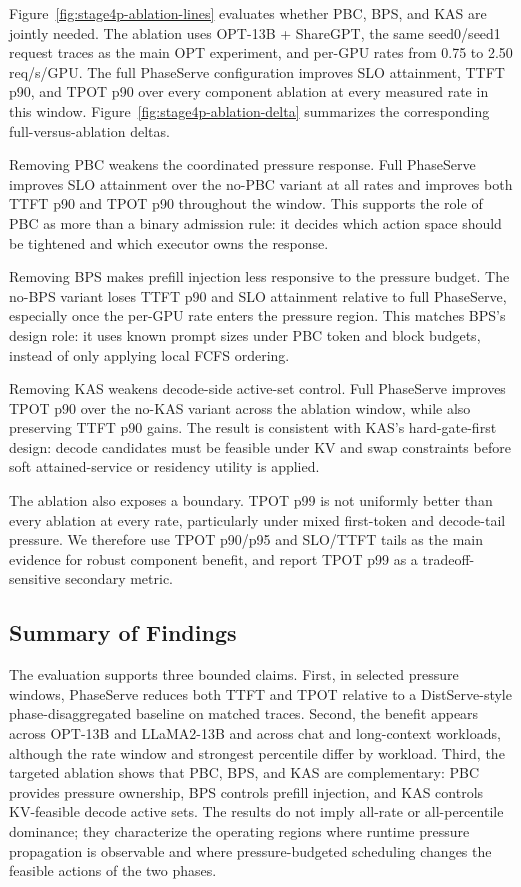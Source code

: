 \documentclass[lettersize,journal]{IEEEtran}
\begin{document}
Figure~\ref{fig:stage4p-ablation-lines} evaluates whether PBC, BPS, and KAS are jointly needed. The ablation uses OPT-13B + ShareGPT, the same seed0/seed1 request traces as the main OPT experiment, and per-GPU rates from 0.75 to 2.50 req/s/GPU. The full PhaseServe configuration improves SLO attainment, TTFT p90, and TPOT p90 over every component ablation at every measured rate in this window. Figure~\ref{fig:stage4p-ablation-delta} summarizes the corresponding full-versus-ablation deltas.

Removing PBC weakens the coordinated pressure response. Full PhaseServe improves SLO attainment over the no-PBC variant at all rates and improves both TTFT p90 and TPOT p90 throughout the window. This supports the role of PBC as more than a binary admission rule: it decides which action space should be tightened and which executor owns the response.

Removing BPS makes prefill injection less responsive to the pressure budget. The no-BPS variant loses TTFT p90 and SLO attainment relative to full PhaseServe, especially once the per-GPU rate enters the pressure region. This matches BPS's design role: it uses known prompt sizes under PBC token and block budgets, instead of only applying local FCFS ordering.

Removing KAS weakens decode-side active-set control. Full PhaseServe improves TPOT p90 over the no-KAS variant across the ablation window, while also preserving TTFT p90 gains. The result is consistent with KAS's hard-gate-first design: decode candidates must be feasible under KV and swap constraints before soft attained-service or residency utility is applied.

The ablation also exposes a boundary. TPOT p99 is not uniformly better than every ablation at every rate, particularly under mixed first-token and decode-tail pressure. We therefore use TPOT p90/p95 and SLO/TTFT tails as the main evidence for robust component benefit, and report TPOT p99 as a tradeoff-sensitive secondary metric.

\subsection{Summary of Findings}

The evaluation supports three bounded claims. First, in selected pressure windows, PhaseServe reduces both TTFT and TPOT relative to a DistServe-style phase-disaggregated baseline on matched traces. Second, the benefit appears across OPT-13B and LLaMA2-13B and across chat and long-context workloads, although the rate window and strongest percentile differ by workload. Third, the targeted ablation shows that PBC, BPS, and KAS are complementary: PBC provides pressure ownership, BPS controls prefill injection, and KAS controls KV-feasible decode active sets. The results do not imply all-rate or all-percentile dominance; they characterize the operating regions where runtime pressure propagation is observable and where pressure-budgeted scheduling changes the feasible actions of the two phases.
\end{document}
